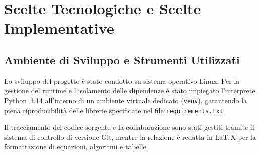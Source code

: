 \section{Scelte Tecnologiche e Scelte Implementative}

\subsection{Ambiente di Sviluppo e Strumenti Utilizzati}
Lo sviluppo del progetto è stato condotto su sistema operativo Linux. Per la gestione del runtime e l'isolamento delle dipendenze è stato impiegato l'interprete Python~3.14 all'interno di un ambiente virtuale dedicato (\texttt{venv}), garantendo la piena riproducibilità delle librerie specificate nel file \texttt{requirements.txt}.

Il tracciamento del codice sorgente e la collaborazione sono stati gestiti tramite il sistema di controllo di versione Git, mentre la relazione è redatta in \LaTeX{} per la formattazione di equazioni, algoritmi e tabelle.

